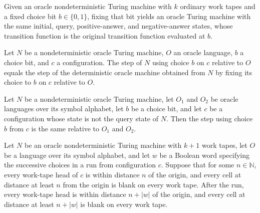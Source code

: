 \begin{definition}
\label{Turing.OracleNDTM.fixChoice}
\leanok
{}
Given an oracle nondeterministic Turing machine with $k$ ordinary work tapes and a fixed
choice bit $b \in \{0,1\}$, fixing that bit yields an oracle Turing machine with the
same initial, query, positive-answer, and negative-answer states, whose transition
function is the original transition function evaluated at $b$.
\end{definition}

\begin{theorem}
\label{Turing.OracleNDTM.stepWith_eq_fixChoice_step}
\leanok
{}
Let $N$ be a nondeterministic oracle Turing machine, $O$ an oracle language, $b$ a
choice bit, and $c$ a configuration. The step of $N$ using choice $b$ on $c$ relative to
$O$ equals the step of the deterministic oracle machine obtained from $N$ by fixing its
choice to $b$ on $c$ relative to $O$.
\end{theorem}

\begin{theorem}
\label{Turing.OracleNDTM.stepWith_eq_of_ne_qQuery}
\leanok
{}
Let $N$ be a nondeterministic oracle Turing machine, let $O_1$ and $O_2$ be oracle
languages over its symbol alphabet, let $b$ be a choice bit, and let $c$ be a
configuration whose state is not the query state of $N$. Then the step using choice $b$
from $c$ is the same relative to $O_1$ and $O_2$.
\end{theorem}

\begin{theorem}
\label{Turing.runWith_headBlank}
\leanok
{}
Let $N$ be an oracle nondeterministic Turing machine with $k+1$ work tapes, let $O$ be a
language over its symbol alphabet, and let $w$ be a Boolean word specifying the
successive choices in a run from configuration $c$. Suppose that for some $n\in\mathbb
N$, every work-tape head of $c$ is within distance $n$ of the origin, and every cell at
distance at least $n$ from the origin is blank on every work tape. After the run, every
work-tape head is within distance $n+|w|$ of the origin, and every cell at distance at
least $n+|w|$ is blank on every work tape.
\end{theorem}

